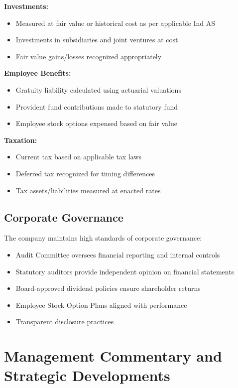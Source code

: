 \documentclass[8pt,a4paper]{article}
\begin{document}
\textbf{Investments:}
\begin{itemize}
    \item Measured at fair value or historical cost as per applicable Ind AS
    \item Investments in subsidiaries and joint ventures at cost
    \item Fair value gains/losses recognized appropriately
\end{itemize}

\textbf{Employee Benefits:}
\begin{itemize}
    \item Gratuity liability calculated using actuarial valuations
    \item Provident fund contributions made to statutory fund
    \item Employee stock options expensed based on fair value
\end{itemize}

\textbf{Taxation:}
\begin{itemize}
    \item Current tax based on applicable tax laws
    \item Deferred tax recognized for timing differences
    \item Tax assets/liabilities measured at enacted rates
\end{itemize}

\subsection{Corporate Governance}

The company maintains high standards of corporate governance:
\begin{itemize}
    \item Audit Committee oversees financial reporting and internal controls
    \item Statutory auditors provide independent opinion on financial statements
    \item Board-approved dividend policies ensure shareholder returns
    \item Employee Stock Option Plans aligned with performance
    \item Transparent disclosure practices
\end{itemize}

\section{Management Commentary and Strategic Developments}
\end{document}

